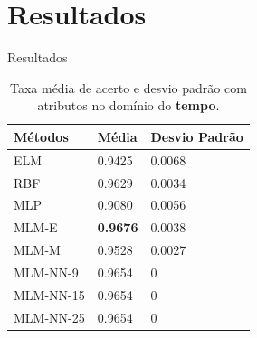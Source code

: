 \documentclass{beamer}
\begin{document}

\section{Resultados}
\begin{frame}{Resultados}

\begin{table}
\begin{tabular}{l l l}
\toprule
\textbf{Métodos} & \textbf{Média} & \textbf{Desvio Padrão} \\
\midrule
	ELM & 0.9425  & \num{0.0068} \\ \hline
	RBF & 0.9629 & \num{0.0034} \\ \hline
	MLP & 0.9080 & \num{0.0056} \\ \hline
	MLM-E & \textbf{0.9676} & \num{0.0038} \\ \hline
	MLM-M & 0.9528 &  \num{0.0027} \\ \hline
	MLM-NN-9  & 0.9654 &  \num{0} \\ \hline
	MLM-NN-15 & 0.9654 & \num{0} \\ \hline
	MLM-NN-25 & 0.9654 &  \num{0} \\ \hline
\bottomrule
\end{tabular}
\caption{Taxa média de acerto e desvio padrão com atributos no domínio do \textbf{tempo}.}
\end{table}

\end{frame}
\end{document}

